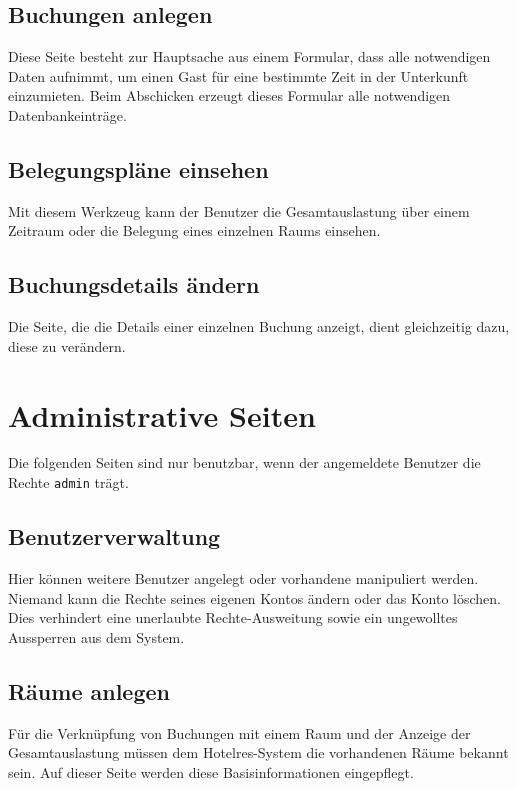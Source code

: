 \documentclass[a4paper,oneside]{scrreprt}
\begin{document}
\subsection*{Buchungen anlegen}

Diese Seite besteht zur Hauptsache aus einem Formular, dass alle notwendigen Daten aufnimmt, um einen Gast für eine bestimmte Zeit in der Unterkunft einzumieten. Beim Abschicken erzeugt dieses Formular alle notwendigen Datenbankeinträge.

\subsection*{Belegungspläne einsehen}

Mit diesem Werkzeug kann der Benutzer die Gesamtauslastung über einem Zeitraum oder die Belegung eines einzelnen Raums einsehen.

\subsection*{Buchungsdetails ändern}

Die Seite, die die Details einer einzelnen Buchung anzeigt, dient gleichzeitig dazu, diese zu verändern.


\section{Administrative Seiten}

Die folgenden Seiten sind nur benutzbar, wenn der angemeldete Benutzer die Rechte \texttt{admin} trägt.

\subsection*{Benutzerverwaltung}

Hier können weitere Benutzer angelegt oder vorhandene manipuliert werden. Niemand kann die Rechte seines eigenen Kontos ändern oder das Konto löschen. Dies verhindert eine unerlaubte Rechte-Ausweitung sowie ein ungewolltes Aussperren aus dem System.

\subsection*{Räume anlegen}

Für die Verknüpfung von Buchungen mit einem Raum und der Anzeige der Gesamtauslastung müssen dem Hotelres-System die vorhandenen Räume bekannt sein. Auf dieser Seite werden diese Basisinformationen eingepflegt.
\end{document}
